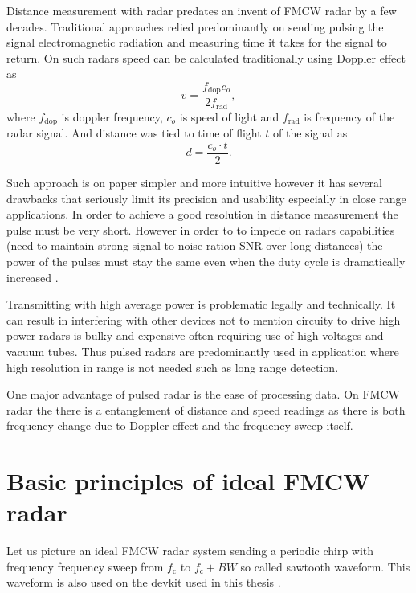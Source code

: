 Distance measurement with radar predates an invent of FMCW radar by a few decades.
Traditional approaches relied predominantly on sending pulsing the signal electromagnetic radiation and measuring time it takes for the signal to return.
On such radars speed can be calculated traditionally using Doppler effect as
\begin{equation}
	v = \frac{f_\mathrm{dop} c_o}{2f_\mathrm{rad}},
	\label{eq:dopler}
\end{equation}
where $f_\mathrm{dop}$ is doppler frequency, $c_o$ is speed of light and $f_\mathrm{rad}$ is frequency of the radar signal.
And distance was tied to time of flight $t$ of the signal as
\begin{equation}
	d = \frac{c_o \cdot t}{2}.
	\label{eq:distance}
\end{equation}

Such approach is on paper simpler and more intuitive however it has several drawbacks that seriously limit its precision and usability especially in close range applications.
In order to achieve a good resolution in distance measurement the pulse must be very short.
However in order to to impede on radars capabilities (need to maintain strong signal-to-noise ration SNR over long distances) the power of the pulses must stay the same even when the duty cycle is dramatically increased \cite{jankiraman2018}.

Transmitting with high average power is problematic legally and technically.
It can result in interfering with other devices not to mention circuity to drive high power radars is bulky and expensive often requiring use of high voltages and vacuum tubes.
Thus pulsed radars are predominantly used in application where high resolution in range is not needed such as long range detection.

One major advantage of pulsed radar is the ease of processing data.
On FMCW radar the there is a entanglement of distance and speed readings as there is both frequency change due to Doppler effect and the frequency sweep itself.

\section{Basic principles of ideal FMCW radar}

Let us picture an ideal FMCW radar system sending a periodic chirp with frequency frequency sweep from $f_\mathrm{c}$ to $f_\mathrm{c}+BW$ so called sawtooth waveform.
This waveform is also used on the devkit used in this thesis \cite{sidarMAN}.


